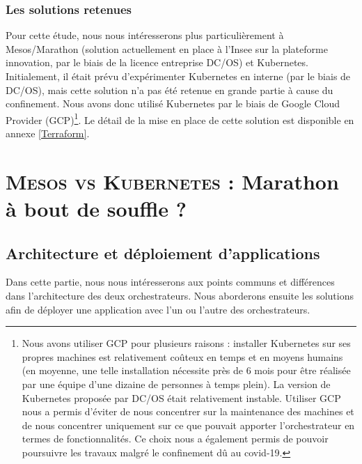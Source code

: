 \documentclass[11pt,fleqn]{book} %
\begin{document}
\section{Les solutions retenues}
Pour cette étude, nous nous intéresserons plus particulièrement à Mesos/Marathon (solution actuellement en place à l'Insee sur la plateforme innovation, par le biais de la licence entreprise DC/OS) et Kubernetes. Initialement, il était prévu d'expérimenter Kubernetes en interne (par le biais de DC/OS), mais cette solution n'a pas été retenue en grande partie à cause du confinement. Nous avons donc utilisé Kubernetes par le biais de Google Cloud Provider (GCP)\footnote{Nous avons utiliser GCP pour plusieurs raisons : installer Kubernetes sur ses propres machines est relativement coûteux en temps et en moyens humains (en moyenne, une telle installation nécessite près de 6 mois pour être réalisée par une équipe d'une dizaine de personnes à temps plein). La version de Kubernetes proposée par DC/OS était relativement instable. Utiliser GCP nous a permis d'éviter de nous concentrer sur la maintenance des machines et de nous concentrer uniquement sur ce que pouvait apporter l'orchestrateur en termes de fonctionnalités. Ce choix nous a également permis de pouvoir poursuivre les travaux malgré le confinement dû au covid-19.}. Le détail de la mise en place de cette solution est disponible en annexe \ref{Terraform}.\newline



\part{\textcolor{ocre}{\textsc{Mesos vs Kubernetes} : Marathon à bout de souffle ?}}



\chapter{Architecture et déploiement d'applications}
\vspace{-2cm}
Dans cette partie, nous nous intéresserons aux points communs et différences dans l'architecture des deux orchestrateurs. Nous aborderons ensuite les solutions afin de déployer une application avec l'un ou l'autre des orchestrateurs.
\end{document}
